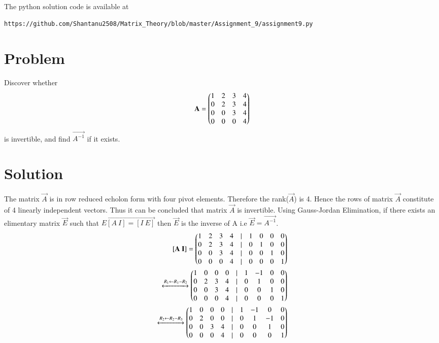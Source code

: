 \documentclass[journal,12pt,twocolumn]{IEEEtran}
\begin{document}
The python solution code is available at
\begin{lstlisting}
https://github.com/Shantanu2508/Matrix_Theory/blob/master/Assignment_9/assignment9.py
\end{lstlisting}

\section{Problem}
Discover whether
\begin{align}
	\mathbf{A}=\begin{pmatrix} 1 & 2 & 3 & 4 \\
			0 & 2 & 3 & 4 \\
			0 & 0 & 3 & 4 \\
			0 & 0 & 0 & 4\end{pmatrix}
\end{align}
is invertible, and find $\vec{A^{-1}}$ if it exists.
\section{Solution}
The matrix $\vec{A}$ is in row reduced echolon form with four pivot elements. Therefore the
rank($\vec{A}$) is 4. Hence the rows of matrix $\vec{A}$ constitute of 4 linearly independent
vectors. Thus it can be concluded that matrix $\vec{A}$ is invertible. Using Gauss-Jordan Elimination,
if there exists an elimentary matrix $\vec{E}$ such that $\vec{E[A \ I]=[I \ E]}$ then $\vec{E}$ is the inverse of A i.e $\vec{E}=\vec{A^{-1}}$.
\begin{align}
	\mathbf{[A \ I]} = \begin{pmatrix} 1 & 2 & 3 & 4 &| & 1 & 0 & 0 & 0 \\
				0 & 2 & 3 & 4 &| & 0 & 1 & 0 & 0 \\
				0 & 0 & 3 & 4 &| & 0 & 0 & 1 & 0 \\
				0 & 0 & 0 & 4 &| & 0 & 0 & 0 & 1 \end{pmatrix}\\
			\xleftrightarrow[]{R_1 \leftarrow R_1 - R_2}
			\begin{pmatrix} 1 & 0 & 0 & 0 &| & 1 & -1 & 0 & 0 \\
                                0 & 2 & 3 & 4 &| & 0 & 1 & 0 & 0 \\
                                0 & 0 & 3 & 4 &| & 0 & 0 & 1 & 0 \\
                                0 & 0 & 0 & 4 &| & 0 & 0 & 0 & 1 \end{pmatrix}\\
			\xleftrightarrow[]{R_2 \leftarrow R_2 - R_3}
                        \begin{pmatrix} 1 & 0 & 0 & 0 &| & 1 & -1 & 0 & 0 \\
                                0 & 2 & 0 & 0 &| & 0 & 1 & -1 & 0 \\
                                0 & 0 & 3 & 4 &| & 0 & 0 & 1 & 0 \\
                                0 & 0 & 0 & 4 &| & 0 & 0 & 0 & 1 \end{pmatrix}
\end{align}
\end{document}

